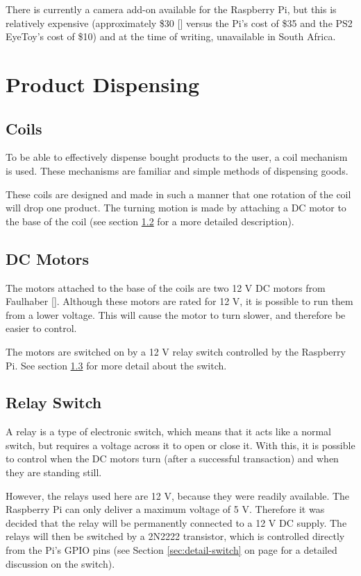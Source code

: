 There is currently a camera add-on available for the Raspberry Pi, but this is relatively
expensive (approximately \$30 [\cite{website:raspi-camera}] versus the Pi's cost of \$35 
and the PS2 EyeToy's cost of \$10) and at the time of writing, unavailable in
South Africa.

\section{Product Dispensing}

\subsection{Coils}

To be able to effectively dispense bought products to the user, a coil mechanism is
used. These mechanisms are familiar and simple methods of dispensing goods.

These coils are designed and made in such a manner that one rotation of the coil will drop one
product. The turning motion is made by attaching a DC motor to the base of the coil (see
section \ref{sec:dc-motor} for a more detailed description).

\subsection{DC Motors}
\label{sec:dc-motor}

The motors attached to the base of the coils are two 12 V DC motors from Faulhaber
[\cite{manual:dc-motors}]. Although these motors are rated for 12 V, it is possible to run them
from a lower voltage. This will cause the motor to turn slower, and therefore be easier to
control. 

The motors are switched on by a 12 V relay switch controlled by the Raspberry Pi. See section
\ref{sec:relay-switch} for more detail about the switch.

\subsection{Relay Switch}
\label{sec:relay-switch}

A relay is a type of electronic switch, which means that it acts like a normal switch, but
requires a voltage across it to open or close it. With this, it is possible to control
when the DC motors turn (after a successful transaction) and when they are standing still. 

However, the relays used here are 12 V, because they were readily available. The Raspberry 
Pi can only deliver a maximum voltage of 5 V. Therefore it was decided that the
relay will be permanently connected to a 12 V DC supply. The relays will then be
switched by a 2N2222 transistor, which is controlled directly from the Pi's 
GPIO pins (see Section \ref{sec:detail-switch} on page
\pageref{sec:detail-switch} for a detailed discussion on the switch).

